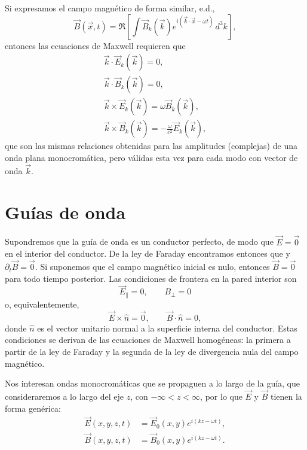 Si expresamos el campo magnético de forma similar, e.d.,
\begin{equation}
\vec{B}(\vec{x},t) = \Re\left[\int\vec{B}_{k}(\vec{k})e^{i(\vec{k}\cdot\vec{x}-\omega t)}\,d^3k\right],
\end{equation}
entonces las ecuaciones de Maxwell requieren que
\begin{align}
\vec{k}\cdot\vec{E}_k(\vec{k})=0, \\
\vec{k}\cdot\vec{B}_k(\vec{k})=0, \\
\vec{k}\times\vec{E}_k(\vec{k})=\omega\vec{B}_k(\vec{k}) , \\
\vec{k}\times\vec{B}_k(\vec{k})=-\frac{\omega}{c^2}\vec{E}_k(\vec{k}),
\end{align}
que son las mismas relaciones obtenidas para las amplitudes (complejas) de una onda plana monocromática, pero válidas esta vez para cada modo con vector de onda $\vec{k}$.


\section{Guías de onda}
Supondremos que la guía de onda es un conductor perfecto, de modo que $\vec{E}=\vec{0}$ en el interior del conductor. De la ley de Faraday encontramos entonces que y $\partial_t\vec{B}=\vec{0}$. Si suponemos que el campo magnético inicial es nulo, entonces $\vec{B}=\vec{0}$ para todo tiempo posterior. Las condiciones de frontera en la pared interior son
\begin{equation}\label{CdBGO}
\vec{E}_\parallel=0, \qquad B_\perp=0
\end{equation}
o, equivalentemente, 
\begin{equation}
\vec{E}\times\hat{n}=\vec{0}, \qquad \vec{B}\cdot\hat{n}=0,
\end{equation}
donde $\hat{n}$ es el vector unitario normal a la superficie interna del conductor.
Estas condiciones se derivan de las ecuaciones de Maxwell homogéneas: la primera a partir de la ley de Faraday y la segunda de la ley de divergencia nula del campo magnético.

Nos interesan ondas monocromáticas que se propaguen a lo largo de la guía, que consideraremos a lo largo del eje $z$, con $-\infty<z<\infty$, por lo que $\vec{E}$ y $\vec{B}$ tienen la forma genérica:
\begin{equation}
\begin{aligned}
    \vec{E}(x, y, z, t) &= \vec{E}_0(x, y)e^{i(kz-\omega t)}, \\
    \vec{B}(x, y, z, t) &= \vec{B}_0(x, y)e^{i(kz-\omega t)}.
\end{aligned}
\label{eq:field_expressions}
\end{equation}

